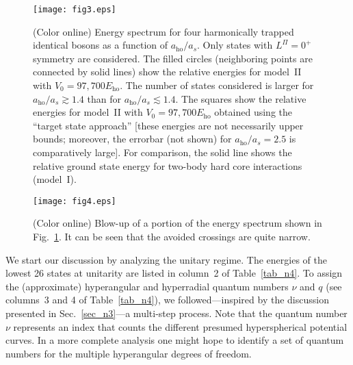 \documentclass[aps,pra,twocolumn,showpacs,superscriptaddress]{revtex4}
\begin{document}
\begin{figure}[t]
  \vspace*{0.5in}
\hspace*{0.1in}
\centering
\texttt{[image: fig3.eps]}
\hspace*{0.1in}
\vspace*{1.5in}
\caption{(Color online)
Energy spectrum for four harmonically
trapped identical bosons as a function of $a_{\text{ho}}/a_s$.
Only states with $L^{\Pi}=0^+$ symmetry are considered.
The filled circles (neighboring points are connected by
solid lines) show the relative energies for
model~II with $V_0=97,700 E_{\text{ho}}$.
The number of states considered is larger for
$a_{\text{ho}}/a_s \gtrsim 1.4$ than
for  $a_{\text{ho}}/a_s \lesssim 1.4$.
The squares show the relative energies for model~II
with $V_0=97,700 E_{\text{ho}}$
obtained using the ``target state approach''
[these energies are not necessarily upper bounds; moreover, the
errorbar (not shown)
for $a_{\text{ho}}/a_s=2.5$ is comparatively large].
For comparison, the solid line shows the relative ground state
energy for two-body hard core interactions (model~I).
}\label{fig_energy_n4}
\end{figure}


\begin{figure}[t]
  \vspace*{0.1in}
\centering
\texttt{[image: fig4.eps]}
\vspace*{.5in}
\caption{(Color online)
  Blow-up of a portion of the energy spectrum
  shown in Fig.~\protect\ref{fig_energy_n4}.
    It can be seen that the avoided crossings are quite narrow.
}\label{fig_energy_n4_blowup}
\end{figure}

We start our discussion by analyzing the
unitary regime.
The energies of the lowest 26 states
at unitarity are listed in column~2 of Table~\ref{tab_n4}.
To assign the (approximate) hyperangular
and hyperradial quantum numbers $\nu$ and 
$q$
(see columns~3 and 4 of Table~\ref{tab_n4}),
we followed---inspired by
the discussion presented in Sec.~\ref{sec_n3}---a multi-step process.
Note that the quantum number $\nu$ represents an index
that counts the different presumed hyperspherical potential curves.
In a more complete analysis one might hope to
identify a set of quantum numbers for the multiple
hyperangular degrees of freedom.
\end{document}
